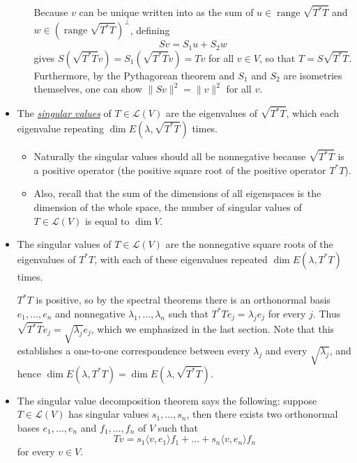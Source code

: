 \documentclass{article}
\newcommand{\df}[1]{\ul{\textit{#1}}}
\renewcommand{\r}{\operatorname{range}}
\renewcommand{\d}{\dim}
\newcommand{\inp}[2]{\langle #1, #2 \rangle}
\newcommand{\nm}[1]{\| #1 \|}
\newcommand{\LV}{\mathcal{L}(V)}
\begin{document}
\begin{itemize}
\begin{itemize}
    Because $v$ can be unique written into as the sum of $u \in \r \sqrt{T^*T}$ and $w \in (\r \sqrt{T^*T})^\perp$, defining $$Sv = S_1 u+ S_2 w$$ gives $S(\sqrt{T^*T}v) = S_1(\sqrt{T^*T}v) = Tv$ for all $v \in V$, so that $T=S\sqrt{T^*T}$. Furthermore, by the Pythagorean theorem and $S_1$ and $S_2$ are  isometries themselves, one can show $\nm{Sv}^2=\nm{v}^2$ for all $v$.
\end{itemize}
\item The \df{singular values} of $T \in \LV$ are the eigenvalues of $\sqrt{T^*T}$, which each eigenvalue repeating $\d E(\lambda, \sqrt{T^*T})$ times.

\begin{itemize}
\item Naturally the singular values should all be nonnegative because $\sqrt{T^*T}$ is a positive operator (the positive square root of the positive operator $T^*T$).
\item Also, recall that the sum of the dimensions of all eigenspaces is the dimension of the whole space, the number of singular values of $T \in \LV$ is equal to $\d V$.
\end{itemize}

\item The singular values of $T \in \LV$ are the nonnegative square roots of the eigenvalues of $T^*T$, with each of these eigenvalues repeated $\d E(\lambda,T^*T)$ times.

$T^*T$ is positive, so by the spectral theorems there is an orthonormal basis $e_1,\dots,e_n$ and nonnegative $\lambda_1,\dots,\lambda_n$ such that $T^*Te_j = \lambda_j e_j$ for every $j$. Thus $\sqrt{T^*T}e_j=\sqrt{\lambda_j}e_j$, which we emphasized in the last section. Note that this establishes a one-to-one correspondence between every $\lambda_j$ and every $\sqrt{\lambda_j}$, and hence $\d E(\lambda, T^*T) = \d E(\lambda, \sqrt{T^*T})$.

\item The singular value decomposition theorem says the following: suppose $T \in \LV$ has singular values $s_1,\dots,s_n$, then there exists two orthonormal bases $e_1,\dots,e_n$ and $f_1,\dots,f_n$ of $V$ such that $$Tv = s_1\inp{v}{e_1}f_1 + \dots + s_n\inp{v}{e_n}f_n$$ for every $v \in V$.


\end{itemize}
\end{document}

